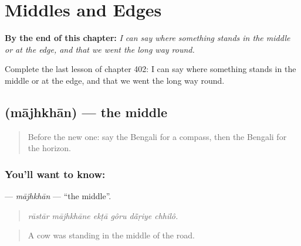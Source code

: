 
\chapter{Middles and Edges}
\label{ch:bn-middles-and-edges}

\begin{chapteropening}
\textbf{By the end of this chapter:} \emph{I can say where something stands in the middle or at the edge, and that we went the long way round.}

Complete the last lesson of chapter 402: I can say where something stands in the middle or at the edge, and that we went the long way round.
\end{chapteropening}

\section[\texorpdfstring{\bn{মাঝখান} (mājhkhān)}{মাঝখান (mājhkhān)}]{ (mājhkhān) — the middle}

\label{lesson:BN-C402-majhkhan}



\begin{quote}
Before the new one: say the Bengali for a compass, then the Bengali for the horizon.
\end{quote}

\subsection*{You'll want to know: }
\textbf{} — \emph{mājhkhān} — \textquotedblleft{}the middle\textquotedblright{}.

\begin{quote}
     
\end{quote}

\begin{quote}
\emph{rāstār mājhkhāne ekṭā gôru dā̃ṛiye chhilô.}
\end{quote}

\begin{quote}
A cow was standing in the middle of the road.
\end{quote}

